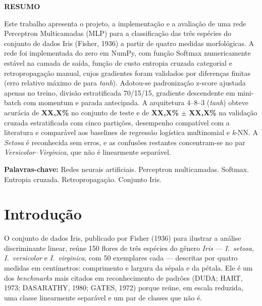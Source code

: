 \documentclass[12pt,a4paper]{article}
\newcommand{\XX}{\textbf{XX,X\%}}
\newcommand{\XN}{\textbf{XX}}
\newcommand{\AccTeste}{\XX}      \newcommand{\FUmTeste}{\XX}     \newcommand{\CETeste}{\XN}
\newcommand{\AccKfold}{\XX}      \newcommand{\DPKfold}{\XX}
\begin{document}
\fazcapa
\fazfolhaderosto

\begin{center}
  {\bfseries RESUMO}
\end{center}
\begin{singlespace}
\noindent
Este trabalho apresenta o projeto, a implementação e a avaliação de uma rede Perceptron
Multicamadas (MLP) para a classificação das três espécies do conjunto de dados Iris (Fisher, 1936)
a partir de quatro medidas morfológicas. A rede foi implementada do zero em NumPy, com função
Softmax numericamente estável na camada de saída, função de custo entropia cruzada categorial e
retropropagação manual, cujos gradientes foram validados por diferenças finitas (erro relativo
máximo de \GCTanh{} para \textit{tanh}). Adotou-se padronização z-score ajustada apenas no treino,
divisão estratificada 70/15/15, gradiente descendente em mini-batch com momentum e parada antecipada.
A arquitetura 4--8--3 (\textit{tanh}) obteve acurácia de \AccTeste{} no conjunto de teste e de
\AccKfold{} $\pm$ \DPKfold{} na validação cruzada estratificada com cinco partições, desempenho
compatível com a literatura e comparável aos baselines de regressão logística multinomial e
\textit{k}-NN. A \textit{Setosa} é reconhecida sem erros, e as confusões restantes concentram-se no
par \textit{Versicolor}--\textit{Virginica}, que não é linearmente separável.

\vspace{0.5cm}
\noindent\textbf{Palavras-chave:} Redes neurais artificiais. Perceptron multicamadas. Softmax.
Entropia cruzada. Retropropagação. Conjunto Iris.
\end{singlespace}
\newpage

\tableofcontents
\newpage

\begin{center}
  {\large\bfseries \TituloTexto\par}
\end{center}
\vspace{0.5cm}

\section{Introdução}
\label{sec:introducao}

O conjunto de dados Iris, publicado por Fisher (1936) para
ilustrar a análise discriminante linear, reúne 150 flores de três espécies do gênero \textit{Iris}
--- \textit{I.~setosa}, \textit{I.~versicolor} e \textit{I.~virginica}, com 50 exemplares cada ---
descritas por quatro medidas em centímetros: comprimento e largura da sépala e da pétala. Ele é um
dos \textit{benchmarks} mais citados em reconhecimento de padrões (DUDA; HART, 1973; DASARATHY, 1980; GATES, 1972) porque
reúne, em escala reduzida, uma classe linearmente separável e um par de classes que não é.
\end{document}
